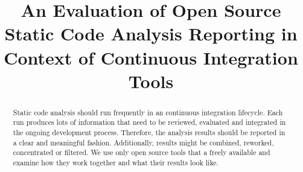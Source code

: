 \documentclass[conference]{IEEEtran}
\begin{document}
%
\title{An Evaluation of Open Source Static Code Analysis Reporting in Context of Continuous Integration Tools}






\author{
	}








\maketitle


\begin{abstract}
Static code analysis should run frequently in an continuous integration lifecycle. Each run produces lots of information that need to be reviewed, evaluated and integrated in the ongoing development process. Therefore, the analysis results should be reported in a clear and meaningful fashion. Additionally, results might be combined, reworked, concentrated or filtered. We use only open source tools that a freely available and examine how they work together and what their results look like.
\end{abstract}


\IEEEpeerreviewmaketitle
\end{document}
